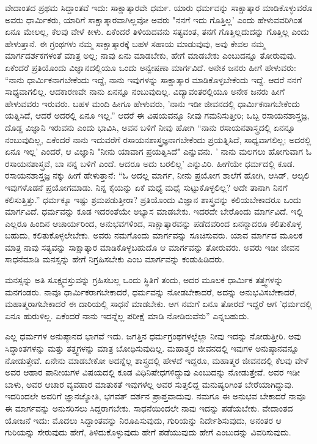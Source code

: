 ವೇದಾಂತದ ಪ್ರಥಮ ಸಿದ್ದಾಂತವೆ ಇದು: ಸಾಕ್ಷಾತ್ಕಾರವೇ ಧರ್ಮ. ಯಾರು ಧರ್ಮವನ್ನು ಸಾಕ್ಷಾತ್ಕಾರ ಮಾಡಿಕೊಳ್ಳುವರೊ ಅವರು ಧಾರ್ಮಿಕರು, ಯಾರಿಗೆ ಸಾಕ್ಷಾತ್ಕಾರವಾಗಿಲ್ಲವೋ ಅವರು "ನನಗೆ ಇದು ಗೊತ್ತಿಲ್ಲ' ಎಂದು ಹೇಳುವವರಿಗಿಂತ ಏನೂ ಮೇಲಲ್ಲ, ಕೆಲವು ವೇಳೆ ಕೀಳು. ಏಕೆಂದರೆ ತಿಳಿಯದವನು ಸತ್ಯವಂತ, ತನಗೆ ಗೊತ್ತಿಲ್ಲದುದನ್ನು ಗೊತ್ತಿಲ್ಲ ಎಂದು ಹೇಳುತ್ತಾನೆ. ಈ ಗ್ರಂಥಗಳು ನಮ್ಮ ಸಾಕ್ಷಾತ್ಕಾರಕ್ಕೆ ಬಹಳ ಸಹಾಯ ಮಾಡುವುವು, ಅವು ಕೇವಲ ನಮ್ಮ ಮಾರ್ಗದರ್ಶಕಗಳಂತೆ ಮಾತ್ರ ಅಲ್ಲ; ನಾವು ಏನು ಮಾಡಬೇಕು, ಹೇಗೆ ಮಾಡಬೇಕು ಎಂಬುದನ್ನೂ ತೋರುವುವು. ಏಕೆಂದರೆ ಪ್ರತಿಯೊಂದು ವಿಜ್ಞಾನದಲ್ಲಿಯೂ ಒಂದು ಅನ್ವೇಷಣಾ ಮಾರ್ಗವಿದೆ. ಅನೇಕ ಜನರು ಹೀಗೆ ಹೇಳುವರು: “ನಾನು ಧಾರ್ಮಿಕನಾಗಬೇಕೆಂದು ಇದ್ದೆ, ನಾನು ಇವುಗಳನ್ನು ಸಾಕ್ಷಾತ್ಕಾರ ಮಾಡಿಕೊಳ್ಳಬೇಕೆಂದು ಇದ್ದೆ. ಆದರೆ ನನಗೆ ಸಾಧ್ಯವಾಗಲಿಲ್ಲ. ಆದಕಾರಣವೇ ನಾನು ಏನನ್ನೂ ನಂಬುವುದಿಲ್ಲ. ವಿದ್ಯಾವಂತರಲ್ಲಿಯೂ ಅನೇಕ ಜನರು ಹೀಗೆ ಹೇಳುವವರು ಇರುವರು. ಬಹಳ ಮಂದಿ ಹೀಗೂ ಹೇಳುವರು, 'ನಾನು ಇಡೀ ಜೀವನದಲ್ಲಿ ಧಾರ್ಮಿಕನಾಗಬೇಕೆಂದು ಯತ್ನಿಸಿದೆ, ಆದರೆ ಅದರಲ್ಲಿ ಏನೂ ಇಲ್ಲ.” ಆದರೆ ಈ ವಿಷಯವನ್ನೂ ನೀವು ಗಮನಿಸುತ್ತೀರಿ; ಒಬ್ಬ ರಸಾಯನಶಾಸ್ತ್ರಜ್ಞ, ದೊಡ್ಡ ವಿಜ್ಞಾನಿ ಇರುವನು ಎಂದು ಭಾವಿಸಿ, ಅವನ ಬಳಿಗೆ ನೀವು ಹೋಗಿ “ನಾನು ರಸಾಯನಶಾಸ್ತ್ರದಲ್ಲಿ ಏನನ್ನೂ ನಂಬುವುದಿಲ್ಲ, ಏಕೆಂದರೆ ನಾನು ಇದುವರೆಗೆ ರಸಾಯನಶಾಸ್ತ್ರಜ್ಞನಾಗಬೇಕೆಂದು ಪ್ರಯತ್ನಿಸಿದೆ, ಸಾಧ್ಯವಾಗಲಿಲ್ಲ; ಅದರಲ್ಲಿ ಏನೂ ಇಲ್ಲ' ಎಂದರೆ, ಆ ವಿಜ್ಞಾನಿ "ನೀನು ಯಾವಾಗ ಪ್ರಯತ್ನಿಸಿದೆ" ಎನ್ನುವನು. ' ನಾನು ಮಲಗಲು ಹೋಗುವಾಗ ಓ ರಸಾಯನಶಾಸ್ತ್ರವೆ, ಬಾ ನನ್ನ ಬಳಿಗೆ ಎಂದೆ. ಆದರೂ ಅದು ಬರಲಿಲ್ಲ' ಎನ್ನುವಿರಿ. ಹೀಗೆಯೇ ಧರ್ಮದಲ್ಲಿ ಕೂಡ. ರಸಾಯನಶಾಸ್ತ್ರಜ್ಞ ನಕ್ಕು ಹೀಗೆ ಹೇಳುತ್ತಾನೆ: “ಓ ಅದಲ್ಲ ಮಾರ್ಗ, ನೀನು ಪ್ರಯೋಗ ಶಾಲೆಗೆ ಹೋಗಿ, ಆಸಿಡ್, ಆಲ್ಕಲಿ ಇವುಗಳೊಡನೆ ಪ್ರಯೋಗಮಾಡು. ನಿನ್ನ ಕೈಯನ್ನು ಏಕೆ ಮಧ್ಯೆ ಮಧೈ ಸುಟ್ಟುಕೊಳ್ಳಲಿಲ್ಲ? ಅದೇ ತಾನಾಗಿ ನಿನಗೆ ಕಲಿಸುತ್ತಿತ್ತು.” ಧರ್ಮಕ್ಕೂ ಇಷ್ಟು ಶ್ರಮಪಡುತ್ತೀರಾ? ಪ್ರತಿಯೊಂದು ವಿಜ್ಞಾನ ಶಾಸ್ತ್ರವನ್ನು ಕಲಿಯಬೇಕಾದರೂ ಒಂದು ಮಾರ್ಗವಿದೆ. ಧರ್ಮವನ್ನು ಕೂಡ ಇದರಂತೆಯೇ ಅಭ್ಯಾಸ ಮಾಡಬೇಕು. ಇದರದೇ ಬೇರೊಂದು ಮಾರ್ಗವಿದೆ. ಇಲ್ಲಿ ಎಲ್ಲರೂ ಹಿಂದಿನ ಆಚಾರ್ಯರಿಂದ, ಅನುಭವಗಳಿಂದ, ಸಾಕ್ಷಾತ್ಕಾರವನ್ನು ಪಡೆದವರಿಂದ ಏನನ್ನಾದರೂ ಕಲಿತುಕೊಳ್ಳ ಬಹುದು, ಕಲಿತುಕೊಳ್ಳಲೇಬೇಕು. ಅವರು ನಮಗೊಂದು ಮಾರ್ಗವನ್ನು ಸೂಚಿಸುವರು. ಯಾವ ಮಾರ್ಗದ ಮೂಲಕ ಮಾತ್ರ ನಾವು ಸತ್ಯವನ್ನು ಸಾಕ್ಷಾತ್ಕಾರ ಮಾಡಿಕೊಳ್ಳಬಹುದೊ ಆ ಮಾರ್ಗವನ್ನು ತೋರುವರು. ಅವರು ಇಡೀ ಜೀವನ ಸಾಧನೆಮಾಡಿ ಮನಸ್ಸನ್ನು ಹೇಗೆ ನಿಗ್ರಹಿಸಬೇಕು ಎಂಬ ಮಾರ್ಗವನ್ನು ಕಂಡುಹಿಡಿದರು.

ಮನಸ್ಸನ್ನು ಅತಿ ಸೂಕ್ಷ್ಮವಸ್ತುವನ್ನು ಗ್ರಹಿಸಬಲ್ಲ ಒಂದು ಸ್ಥಿತಿಗೆ ತಂದು, ಅದರ ಮೂಲಕ ಧಾರ್ಮಿಕ ತತ್ತ್ವಗಳನ್ನು ಮನಗಂಡರು. ನಾವೂ ಧಾರ್ಮಿಕರಾಗಬೇಕಾದರೆ, ಧರ್ಮವನ್ನು ನೋಡಬೇಕಾದರೆ, ಅದನ್ನು ಅನುಭವಿಸಬೇಕಾದರೆ, ಮಹಾತ್ಮರಾಗಬೇಕಾದರೆ ಈ ದಾರಿಯಲ್ಲಿ ಸಾಧನೆ ಮಾಡಬೇಕು. ಆಗ ನಮಗೆ ಏನೂ ತೋರದೆ ಇದ್ದರೆ ಆಗ 'ಧರ್ಮದಲ್ಲಿ ಏನೂ ಹುರುಳಿಲ್ಲ. ಏಕೆಂದರೆ ನಾನು ಇದನ್ನೆಲ್ಲ ಪರೀಕ್ಷೆ ಮಾಡಿ ನೋಡಿರುವೆನು” ಎನ್ನಬಹುದು.

ಎಲ್ಲ ಧರ್ಮಗಳ ಅನುಷ್ಠಾನದ ಭಾಗವೆ ಇದು. ಜಗತ್ತಿನ ಧರ್ಮಗ್ರಂಥಗಳಲ್ಲೆಲ್ಲಾ ನೀವು ಇದನ್ನು ನೋಡುತ್ತೀರಿ. ಅವು ಸಿದ್ಧಾಂತಗಳನ್ನು ಮತ್ತು ತತ್ತ್ವಗಳನ್ನು ಮಾತ್ರ ಬೋಧಿಸುವುದಿಲ್ಲ. ಮಹಾತ್ಮರ ಜೀವನದಲ್ಲಿ ಇವುಗಳ ಅನುಷ್ಠಾನವನ್ನೂ ನೋಡುತ್ತೇವೆ. ಏನೇನು ಮಾಡಬೇಕೋ ಅದನ್ನೆಲ್ಲ ಶಾಸ್ತ್ರದಲ್ಲಿ ಹೇಳದೆ ಇದ್ದರೂ, ಮಹಾತ್ಮರ ಜೀವನದಲ್ಲಿ ಕೆಲವು ವೇಳೆ ಅವರ ಆಹಾರ ಪಾನೀಯಗಳ ವಿಷಯದಲ್ಲಿ ಕೂಡ ವಿಧಿನಿಷೇಧಗಳಿದ್ದುವು ಎಂಬುದನ್ನು ನೋಡುತ್ತೇವೆ. ಅವರ ಇಡೀ ಬಾಳು, ಅವರ ಆಚಾರ ವ್ಯವಹಾರ ಮಾತುಕತೆ ಇವುಗಳೆಲ್ಲ ಅವರ ಸುತ್ತಲಿದ್ದ ಮನುಷ್ಯರಿಗಿಂತ ಬೇರೆಯಾಗಿದ್ದುವು. ಇದರಿಂದಲೇ ಅವರಿಗೆ ಜ್ಞಾನಜ್ಯೋತಿ, ಭಗವತ್ ದರ್ಶನ ಪ್ರಾಪ್ತವಾದುವು. ನಮಗೂ ಈ ಅನುಭವ ಬೇಕಾದರೆ ನಾವೂ ಈ ಮಾರ್ಗವನ್ನು ಅನುಸರಿಸಲು ಸಿದ್ದರಾಗಬೇಕು. ಸಾಧನೆಯಿಂದಲೇ ನಾವು ಇದನ್ನು ಪಡೆಯಬೇಕು. ವೇದಾಂತದ ಯೋಜನೆ ಇದು: ಮೊದಲು ಸಿದ್ದಾಂತವನ್ನು ನಿರೂಪಿಸುವುದು, ಗುರಿಯನ್ನು ನಿರ್ದೇಶಿಸುವುದು, ಅನಂತರ ಆ ಗುರಿಯನ್ನು ಸೇರುವುದು ಹೇಗೆ, ತಿಳಿದುಕೊಳ್ಳುವುದು ಹೇಗೆ ಪಡೆಯುವುದು ಹೇಗೆ ಎಂಬುದನ್ನು ವಿವರಿಸುವುದು.

